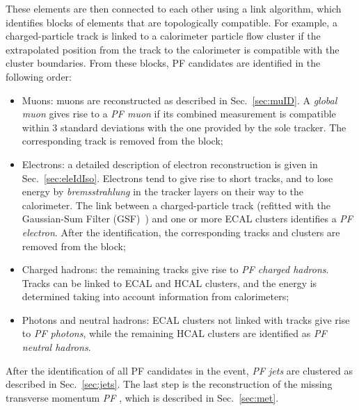 These elements are then connected to each other using a link algorithm, which identifies blocks of elements that are topologically compatible. For example, a charged-particle track is linked to a calorimeter particle flow cluster if the extrapolated position from the track to the calorimeter is compatible with the cluster boundaries. From these blocks, PF candidates are identified in the following order:
\begin{itemize}
\item Muons: muons are reconstructed as described in Sec.~\ref{sec:muID}. A \emph{global muon} gives rise to a \emph{PF muon} if its combined \pt measurement is compatible within 3 standard deviations with the one provided by the sole tracker. The corresponding track is removed from the block;
\item Electrons: a detailed description of electron reconstruction is given in Sec.~\ref{sec:eleIdIso}. Electrons tend to give rise to short tracks, and to lose energy by \emph{bremsstrahlung} in the tracker layers on their way to the calorimeter. The link between a charged-particle track (refitted with the Gaussian-Sum Filter (GSF)~\cite{Adam:815410}) and one or more ECAL clusters identifies a \emph{PF electron}. After the identification, the corresponding tracks and clusters are removed from the block;
\item Charged hadrons: the remaining tracks give rise to \emph{PF charged hadrons}. Tracks can be linked to ECAL and HCAL clusters, and the energy is determined taking into account information from calorimeters;
\item Photons and neutral hadrons: ECAL clusters not linked with tracks give rise to \emph{PF photons}, while the remaining HCAL clusters are identified as \emph{PF neutral hadrons}.
\end{itemize}
After the identification of all PF candidates in the event, \emph{PF jets} are clustered as described in Sec.~\ref{sec:jets}. The last step is the reconstruction of the missing transverse momentum \emph{PF \ptmiss}, which is described in Sec.~\ref{sec:met}.
